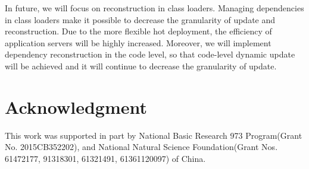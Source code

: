 \documentclass[conference]{IEEEtran}
\begin{document}
In future, we will focus on reconstruction in class loaders.
Managing dependencies in class loaders make it possible to decrease the granularity of update and reconstruction.
Due to the more flexible hot deployment, the efficiency of application servers will be highly increased.
Moreover, we will implement dependency reconstruction in the code level\cite{future_Gu}, so that code-level dynamic update will be achieved and it will continue to decrease the granularity of update.


\section*{Acknowledgment}
This work was supported in part by National Basic Research 973 Program(Grant No. 2015CB352202), and National Natural Science Foundation(Grant Nos. 61472177, 91318301, 61321491, 61361120097) of China.

\end{document}
